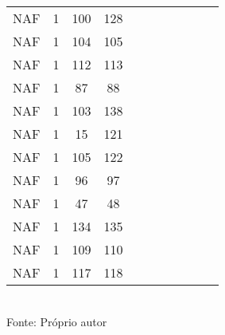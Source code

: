 \begin{table}[H]
{\begin{tabular}{ccccccccccc}
NAF & 1 & 100 & 128 &  &  &  &  &  &  &  \\
NAF & 1 & 104 & 105 &  &  &  &  &  &  &  \\
NAF & 1 & 112 & 113 &  &  &  &  &  &  &  \\
NAF & 1 & 87 & 88 &  &  &  &  &  &  &  \\
NAF & 1 & 103 & 138 &  &  &  &  &  &  &  \\
NAF & 1 & 15 & 121 &  &  &  &  &  &  &  \\
NAF & 1 & 105 & 122 &  &  &  &  &  &  &  \\
NAF & 1 & 96 & 97 &  &  &  &  &  &  &  \\
NAF & 1 & 47 & 48 &  &  &  &  &  &  &  \\
NAF & 1 & 134 & 135 &  &  &  &  &  &  &  \\
NAF & 1 & 109 & 110 &  &  &  &  &  &  &  \\
NAF & 1 & 117 & 118 &  &  &  &  &  &  &  \\
\bottomrule
\end{tabular}}
\\Fonte: Próprio autor
\end{table}



